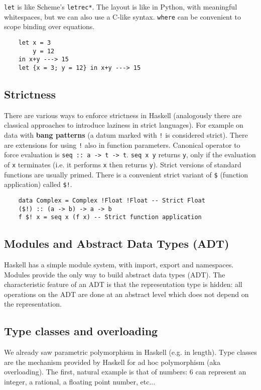 \texttt{let} is like Scheme's \texttt{letrec*}.
The layout is like in Python, with meaningful whitespaces, but we can also use a C-like syntax.
\texttt{where} can be convenient to scope binding over equations.
\begin{lstlisting}
	let x = 3
		y = 12
	in x+y ---> 15
	let {x = 3; y = 12} in x+y ---> 15
\end{lstlisting}

\subsection{Strictness}
There are various ways to enforce strictness in Haskell (analogously there are classical approaches to introduce laziness in strict languages).
For example on data with \textbf{bang patterns} (a datum marked with \texttt{!} is considered strict).
There are extensions for using \texttt{!} also in function parameters.
Canonical operator to force evaluation is \texttt{seq :: a -> t -> t}.
\texttt{seq x y} returns \texttt{y}, only if the evaluation of \texttt{x} terminates (i.e. it performs \texttt{x} then returns \texttt{y}).
Strict versions of standard functions are usually primed.
There is a convenient strict variant of \texttt{\$} (function application) called \texttt{\$!}.
\begin{lstlisting}
	data Complex = Complex !Float !Float -- Strict Float
	($!) :: (a -> b) -> a -> b
	f $! x = seq x (f x) -- Strict function application
\end{lstlisting}

\subsection{Modules and Abstract Data Types (ADT)}
Haskell has a simple module system, with import, export and namespaces.
Modules provide the only way to build abstract data types (ADT).
The characteristic feature of an ADT is that the representation type is hidden: all operations on the ADT are done at an abstract level which does not depend on the representation.

\subsection{Type classes and overloading}
We already saw parametric polymorphism in Haskell (e.g. in length).
Type classes are the mechanism provided by Haskell for ad hoc polymorphism (aka overloading).
The first, natural example is that of numbers: 6 can represent an integer, a rational, a floating point number, etc...

